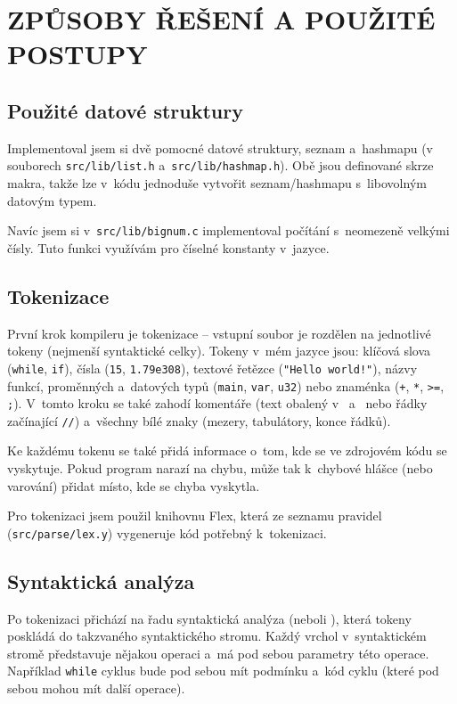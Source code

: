 \documentclass[12pt]{article}
\def\file#1{\texttt{#1}}
\def\code#1{\texttt{#1}}
\begin{document}
\section{ZPŮSOBY ŘEŠENÍ A POUŽITÉ POSTUPY}
\subsection{Použité datové struktury}
Implementoval jsem si dvě pomocné datové struktury, seznam a~hashmapu (v souborech \file{src/lib/list.h} a~\file{src/lib/hashmap.h}).
Obě jsou definované skrze makra, takže lze v~kódu jednoduše vytvořit seznam/hashmapu s~libovolným datovým typem.

Navíc jsem si v~\file{src/lib/bignum.c} implementoval počítání s~neomezeně velkými čísly. Tuto funkci využívám pro číselné konstanty v~jazyce.

\subsection{Tokenizace}
První krok kompileru je tokenizace -- vstupní soubor je rozdělen na jednotlivé tokeny (nejmenší syntaktické celky).
Tokeny v~mém jazyce jsou: klíčová slova (\code{while}, \code{if}), čísla (\code{15}, \code{1.79e308}), textové řetězce (\code{"Hello world!"}),
názvy funkcí, proměnných a~datových typů (\code{main}, \code{var}, \code{u32}) nebo znaménka (\code{+}, \code{*}, \code{>=}, \code{;}).
V~tomto kroku se také zahodí komentáře (text obalený v~\uv{\code{/*}} a~\uv{\code{*/}} nebo řádky začínající \code{//}) a~všechny bílé znaky (mezery, tabulátory, konce řádků).

Ke každému tokenu se také přidá informace o~tom, kde se ve zdrojovém kódu se vyskytuje. Pokud program narazí na chybu, může tak k~chybové hlášce (nebo varování) přidat místo, kde se chyba vyskytla.

Pro tokenizaci jsem použil knihovnu Flex, která ze seznamu pravidel (\file{src/parse/lex.y}) vygeneruje kód potřebný k~tokenizaci.


\subsection{Syntaktická analýza}
Po tokenizaci přichází na řadu syntaktická analýza (neboli ), která tokeny poskládá do takzvaného syntaktického stromu.
Každý vrchol v~syntaktickém stromě představuje nějakou operaci a~má pod sebou parametry této operace.
Například \code{while} cyklus bude pod sebou mít podmínku a~kód cyklu (které pod sebou mohou mít další operace).
\end{document}
